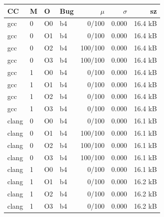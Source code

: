 \begin{tabular}{llllrrr}
\toprule
CC & M & O & Bug & $\mu$ & $\sigma$ & sz \\
\midrule
gcc & 0 & O0 & b4 & 0/100 & 0.000 & 16.4 kB \\
gcc & 0 & O1 & b4 & 0/100 & 0.000 & 16.4 kB \\
gcc & 0 & O2 & b4 & 100/100 & 0.000 & 16.4 kB \\
gcc & 0 & O3 & b4 & 100/100 & 0.000 & 16.4 kB \\
gcc & 1 & O0 & b4 & 0/100 & 0.000 & 16.4 kB \\
gcc & 1 & O1 & b4 & 0/100 & 0.000 & 16.4 kB \\
gcc & 1 & O2 & b4 & 0/100 & 0.000 & 16.4 kB \\
gcc & 1 & O3 & b4 & 0/100 & 0.000 & 16.4 kB \\
clang & 0 & O0 & b4 & 0/100 & 0.000 & 16.1 kB \\
clang & 0 & O1 & b4 & 100/100 & 0.000 & 16.1 kB \\
clang & 0 & O2 & b4 & 100/100 & 0.000 & 16.1 kB \\
clang & 0 & O3 & b4 & 100/100 & 0.000 & 16.1 kB \\
clang & 1 & O0 & b4 & 0/100 & 0.000 & 16.1 kB \\
clang & 1 & O1 & b4 & 0/100 & 0.000 & 16.2 kB \\
clang & 1 & O2 & b4 & 0/100 & 0.000 & 16.2 kB \\
clang & 1 & O3 & b4 & 0/100 & 0.000 & 16.2 kB \\
\bottomrule
\end{tabular}
